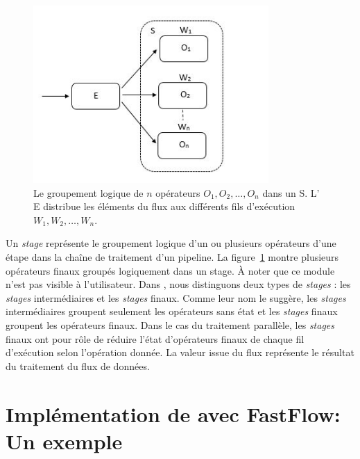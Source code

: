 \begin{figure}[ht]
\centering
     \includegraphics[width=0.8\textwidth]{Figures/Stages.jpg}
      \caption[Le groupement logique de $n$ op\'erateurs $O_1, O_2, \ldots, O_n$ dans un  S.]{Le groupement logique de $n$ op\'erateurs $O_1, O_2, \ldots, O_n$ dans un  S.  L' E distribue les \'el\'ements du flux aux diff\'erents fils d'ex\'ecution $W_1, W_2, \ldots, W_n$.}
       \label{Stages.fig}
\end{figure}

Un \emph{stage} repr\'esente le groupement logique d'un ou plusieurs op\'erateurs d'une \'etape dans la cha\^ine de traitement d'un pipeline. La figure~\ref{Stages.fig} montre plusieurs op\'erateurs finaux group\'es logiquement dans un stage.  \`A noter que ce module n'est pas visible \`a l'utilisateur. Dans , nous distinguons deux types de \emph{stages} : les \emph{stages} interm\'ediaires et les \emph{stages} finaux. Comme leur nom le sugg\`ere, les \emph{stages} interm\'ediaires groupent seulement les op\'erateurs sans \'etat et les \emph{stages} finaux groupent les op\'erateurs finaux. Dans le cas du traitement parall\`ele, les \emph{stages} finaux ont pour r\^ole de r\'eduire l'\'etat d'op\'erateurs finaux de chaque fil d'ex\'ecution selon l'op\'eration donn\'ee. La valeur issue du flux repr\'esente le r\'esultat du traitement du flux de donn\'ees.



\section{Impl\'ementation de  avec FastFlow: Un exemple}

